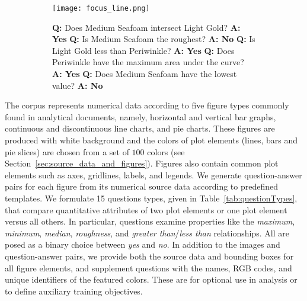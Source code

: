 \documentclass{article} \usepackage{iclr2018_workshop,times}
\begin{document}
\begin{figure}[h]
    \centering
    \caption{Sample line plot figure with question-answer pairs.}
    \label{fig:sample_line_qa}
    \begin{subfigure}[]{0.65\textwidth}
        \texttt{[image: focus\_line.png]}
    \end{subfigure}
    \hfill
    \begin{subfigure}[]{0.3\textwidth}
        \textbf{Q:} Does Medium Seafoam intersect Light Gold?\newline
        \textbf{A: Yes}\newline\newline
        \textbf{Q:} Is Medium Seafoam the roughest?\newline
        \textbf{A: No}\newline\newline
        \textbf{Q:} Is Light Gold less than Periwinkle?\newline
        \textbf{A: Yes}\newline\newline
        \textbf{Q:} Does Periwinkle have the maximum area under the curve?\newline
        \textbf{A: Yes}\newline\newline
        \textbf{Q:} Does Medium Seafoam have the lowest value?\newline
        \textbf{A: No}
    \end{subfigure}
\end{figure}

The corpus represents numerical data according to five figure types commonly found in analytical documents, namely, horizontal and vertical bar graphs, continuous and discontinuous line charts, and pie charts. These figures are produced with white background and the colors of plot elements (lines, bars and pie slices) are chosen from a set of $100$ colors (see Section~\ref{sec:source_data_and_figures}). Figures also contain common plot elements such as axes, gridlines, labels, and legends.
We generate question-answer pairs for each figure from its numerical source data according to predefined templates. We formulate 15 questions types, given in Table~\ref{tab:questionTypes}, that compare quantitative attributes of two plot elements or one plot element versus all others. In particular, questions examine properties like the \emph{maximum}, \emph{minimum}, \emph{median}, \emph{roughness}, and \emph{greater than}/\emph{less than} relationships. All are posed as a binary choice between \emph{yes} and \emph{no}.
In addition to the images and question-answer pairs, we provide both the source data and bounding boxes for all figure elements, and supplement questions with the names, RGB codes, and unique identifiers of the featured colors. These are for optional use in analysis or to define auxiliary training objectives.
\end{document}
